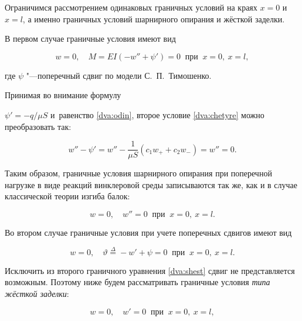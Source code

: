 Ограничимся рассмотрением одинаковых граничных условий на краях $x=0$ и $x=l$, а именно граничных условий шарнирного опирания и жёсткой заделки.



В первом случае граничные условия имеют вид \cite{mich-3}

\begin{equation}\label{dva:chetyre}

w=0,\quad  M=EI(-w''+\psi')=0\ \text{~при~}\ x=0,\ x=l,

\end{equation}

где $\psi$ "---поперечный сдвиг по модели С.~П.~Тимошенко.



Принимая во внимание формулу

$\psi'=-q/\mu S$ и~равенство \eqref{dva:odin}, второе условие \eqref{dva:chetyre} можно преобразовать так:

\begin{equation*}

w''-\psi'=w''-\frac{1}{\mu S}(c_1w_++c_2w_-)=w''=0.

\end{equation*}



Таким образом, граничные условия шарнирного опирания при поперечной нагрузке в виде реакций винклеровой среды записываются так же, как и в случае классической теории изгиба балок:

\begin{equation}\label{dva:pyat}

w=0,\quad  w''=0\ \text{~при~}\ x=0,\ x=l.

\end{equation}



Во втором случае граничные условия при учете поперечных сдвигов имеют вид

\begin{equation}\label{dva:shest}

w=0,\quad \vartheta\stackrel{\Delta}{=}-w'+\psi=0\ \text{~при~}\ x=0,\ x=l.

\end{equation}

Исключить из второго граничного уравнения \eqref{dva:shest} сдвиг не представляется возможным. Поэтому ниже будем рассматривать граничные условия \textit{типа жёсткой заделки}\/:

\begin{equation*} %

w=0,\quad  w'=0\ \text{~при~}\ x=0,\ x=l,

\end{equation*}

